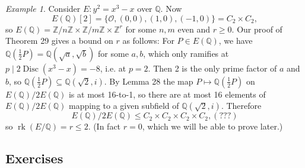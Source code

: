 \documentclass[a4paper]{article}
\theoremstyle{plain}
\theoremstyle{remark}
\newtheorem*{example}{Example}
\theoremstyle{definition}
\DeclareMathOperator{\Disc}{Disc}
\DeclareMathOperator{\rk}{rk}
\renewcommand{\O}{\mathcal{O}}
\newcommand{\Z}{\mathbb{Z}}
\newcommand{\Q}{\mathbb{Q}}
\begin{document}
\begin{example}
    Consider $E:y^2=x^3-x$ over $\Q$. Now
    \begin{equation*}
        E(\Q)[2]=\{\O,(0,0),(1,0),(-1,0)\}=C_2\times C_2,
    \end{equation*}
    so $E(\Q)=\Z/n\Z\times\Z/m\Z\times\Z^r$ for some $n,m$ even and $r\ge0$.
    Our proof of Theorem 29 gives a bound on $r$ as follows: For $P\in E(\Q)$,
    we have $\Q(\frac{1}{2}P)=\Q(\sqrt a,\sqrt b)$ for some $a,b$, which only
    ramifies at $p\mid 2\Disc(x^3-x)=-8$, i.e. at $p=2$. Then 2 is the only
    prime factor of $a$ and $b$, so $\Q(\frac{1}{2}P)\subseteq\Q(\sqrt2,i)$. By
    Lemma 28 the map $P\mapsto\Q(\frac{1}{2}P)$ on $E(\Q)/2E(\Q)$ is at most
    16-to-1, so there are at most 16 elements of $E(\Q)/2E(\Q)$ mapping to a
    given subfield of $\Q(\sqrt2,i)$. Therefore
    \begin{equation*}
        E(\Q)/2E(\Q) \le C_2\times C_2\times C_2\times C_2, (???)
    \end{equation*}
    so $\rk(E/\Q)=r\le2$. (In fact $r=0$, which we will be able to prove later.)
\end{example}

\subsection*{Exercises}
\end{document}
